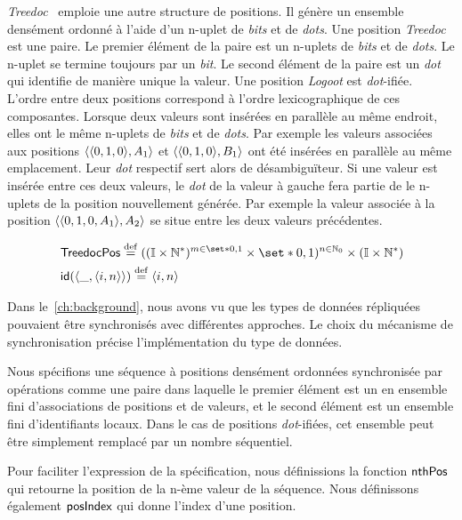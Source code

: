 \emph{Treedoc}~\autocite{preguica_2009_treedoc} emploie une autre structure de positions.
Il génère un ensemble densément ordonné à l'aide d'un n-uplet de \emph{bits} et de \emph{dots}.
Une position \emph{Treedoc} est une paire.
Le premier élément de la paire est un n-uplets de \emph{bits} et de \emph{dots}.
Le n-uplet se termine toujours par un \emph{bit}.
Le second élément de la paire est un \emph{dot} qui identifie de manière unique la valeur.
Une position \emph{Logoot} est \emph{dot}-ifiée.
L'ordre entre deux positions correspond à l'ordre lexicographique de ces composantes.
Lorsque deux valeurs sont insérées en parallèle au même endroit, elles ont le même n-uplets de \emph{bits} et de \emph{dots}.
Par exemple les valeurs associées aux positions $\tuple{\tuple*{0, 1, 0},A_1}$ et $\tuple{\tuple*{0, 1, 0},B_1}$ ont été insérées en parallèle au même emplacement.
Leur \emph{dot} respectif sert alors de désambiguïteur.
Si une valeur est insérée entre ces deux valeurs, le \emph{dot} de la valeur à gauche fera partie de le n-uplets de la position nouvellement générée.
Par exemple la valeur associée à la position $\tuple{\tuple*{0, 1, 0, A_1},A_2}$ se situe entre les deux valeurs précédentes.

\begin{equation*}\begin{split}
&\trm{TreedocPos} \defeq ((\mathbb{I} \times \mathbb{N}^*)^{m \in \set*{0, 1}} \times \set*{0, 1})^{n \in \mathbb{N}_0} \times (\mathbb{I} \times \mathbb{N}^*)\\
&\trm{id}(\tuple*{\_, \tuple*{i, n}}) \defeq \tuple*{i, n}
\end{split}\end{equation*}

Dans le~\autoref{ch:background}, nous avons vu que les types de données répliquées pouvaient être synchronisés avec différentes approches.
Le choix du mécanisme de synchronisation précise l'implémentation du type de données.

Nous spécifions une séquence à positions densément ordonnées synchronisée par opérations comme une paire dans laquelle le premier élément est un en ensemble fini d'associations de positions et de valeurs, et le second élément est un ensemble fini d'identifiants locaux.
Dans le cas de positions \emph{dot}-ifiées, cet ensemble peut être simplement remplacé par un nombre séquentiel.

Pour faciliter l'expression de la spécification, nous définissions la fonction $\operatorname{\mathsf{nthPos}}$ qui retourne la position de la n-ème valeur de la séquence.
Nous définissons également $\operatorname{\mathsf{posIndex}}$ qui donne l'index d'une position.

